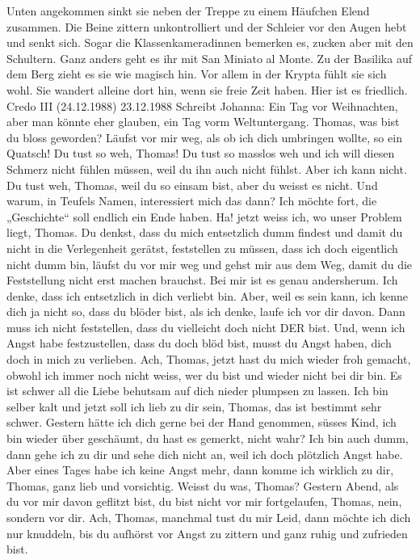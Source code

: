 Unten angekommen sinkt sie neben der Treppe zu einem Häufchen Elend zusammen. Die Beine zittern unkontrolliert und der Schleier vor den Augen hebt und senkt sich. Sogar die Klassenkameradinnen bemerken es, zucken aber mit den Schultern.
Ganz anders geht es ihr mit San Miniato al Monte. Zu der Basilika auf dem Berg zieht es sie wie magisch hin. Vor allem in der Krypta fühlt sie sich wohl. Sie wandert alleine dort hin, wenn sie freie Zeit haben. Hier ist es friedlich.
Credo III (24.12.1988)
23.12.1988
Schreibt Johanna:
Ein Tag vor Weihnachten, aber man könnte eher glauben, ein Tag vorm Weltuntergang.
Thomas, was bist du bloss geworden?
Läufst vor mir weg, als ob ich dich umbringen wollte, so ein Quatsch!
Du tust so weh, Thomas!
Du tust so masslos weh und ich will diesen Schmerz nicht fühlen müssen, weil du ihn auch nicht fühlst.
Aber ich kann nicht.
Du tust weh, Thomas, weil du so einsam bist, aber du weisst es nicht. Und warum, in Teufels Namen, interessiert mich das dann?
Ich möchte fort, die „Geschichte“ soll endlich ein Ende haben.
Ha! jetzt weiss ich, wo unser Problem liegt, Thomas.
Du denkst, dass du mich entsetzlich dumm findest und damit du nicht in die Verlegenheit gerätst, feststellen zu müssen, dass ich doch eigentlich nicht dumm bin, läufst du vor mir weg und gehst mir aus dem Weg, damit du die Feststellung nicht erst machen brauchst.
Bei mir ist es genau andersherum. Ich denke, dass ich entsetzlich in dich verliebt bin. Aber, weil es sein kann, ich kenne dich  ja nicht so, dass du blöder bist, als ich denke, laufe ich vor dir davon. Dann muss ich nicht feststellen, dass du vielleicht doch nicht DER bist.
Und, wenn ich Angst habe festzustellen, dass du doch blöd bist, musst du Angst haben, dich doch in mich zu verlieben.
Ach, Thomas, jetzt hast du mich wieder froh gemacht, obwohl ich immer noch nicht weiss, wer du bist und wieder nicht bei dir bin.
Es ist schwer all die Liebe behutsam auf dich nieder plumpsen zu lassen.
Ich bin selber kalt und jetzt soll ich lieb zu dir sein, Thomas, das ist bestimmt sehr schwer.
Gestern hätte ich dich gerne bei der Hand genommen, süsses Kind, ich bin wieder über geschäumt, du hast es gemerkt, nicht wahr?
Ich bin auch dumm, dann gehe ich zu dir und sehe dich nicht an, weil ich doch plötzlich Angst habe.
Aber eines Tages habe ich keine Angst mehr, dann komme ich wirklich zu dir, Thomas, ganz lieb und vorsichtig.
Weisst du was, Thomas?
Gestern Abend, als du vor mir davon geflitzt bist, du bist nicht vor mir fortgelaufen, Thomas, nein, sondern vor dir. Ach, Thomas, manchmal tust du mir Leid, dann möchte ich dich nur knuddeln, bis du aufhörst vor Angst zu zittern und ganz ruhig und zufrieden bist.
